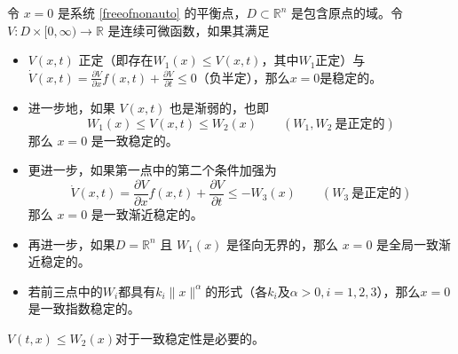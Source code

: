 \begin{theorem}[非自治系统的Lyapunov稳定性定理]\label{lyapunov_nonauto}
  令 $x = 0$ 是系统 \eqref{freeofnonauto} 的平衡点，$D \subset
  \mathbb{R}^n$ 是包含原点的域。令 $V: D \times [0, \infty) \rightarrow \mathbb{R}$
  是连续可微函数，如果其满足
  \begin{itemize}[leftmargin=1em]
    \item $V (x, t)$ 正定（即存在$W_1 (x) \leq V (x, t)$，其中$W_1$正定）与
    $\dot{V} (x, t) = \frac{\partial V}{\partial x} f (x, t) + \frac{\partial V}{\partial t} \leq 0$（负半定），那么$x=0$是稳定的。
    
    \item 进一步地，如果 $V (x, t)$ 也是渐弱的，也即
    \[ W_1 (x) \leq V (x, t) \leq W_2 (x) \qquad (W_1, W_2 \ \text{是正定的}) \]
    那么 $x = 0$ 是一致稳定的。

    \item 更进一步，如果第一点中的第二个条件加强为
    \[ \dot{V} (x, t) = \frac{\partial V}{\partial x} f (x, t) + \frac{\partial
       V}{\partial t} \leq - W_3 (x) \qquad (W_3 \ \text{是正定的}) \]
    那么 $x = 0$ 是一致渐近稳定的。
    
    \item 再进一步，如果$D=\mathbb{R}^n$ 且 $W_1 (x)$ 是径向无界的，那么 $x = 0$ 是全局一致渐近稳定的。

    \item 若前三点中的$W_i$都具有$k_i \| x \|^\alpha $的形式（各$k_i$及$\alpha> 0,i=1,2,3$），那么$x = 0$ 是一致指数稳定的。
  \end{itemize}
\end{theorem}
\begin{note}
  $V(t,x)\le W_2(x)$对于一致稳定性是必要的。
\end{note}
